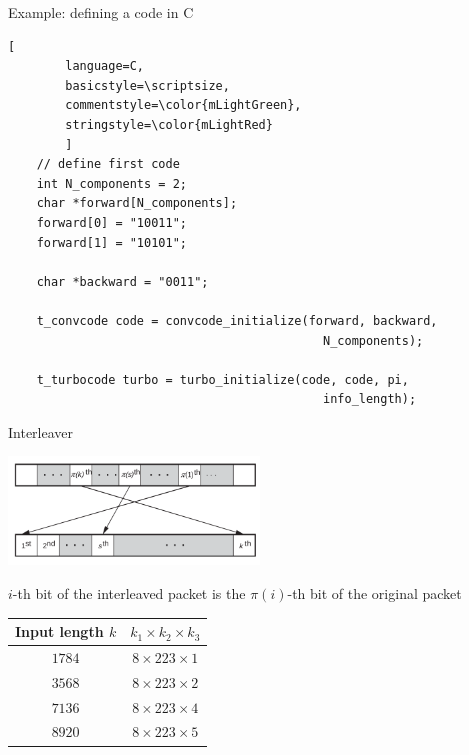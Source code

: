 \documentclass[xcolor={usenames,dvipsnames},11pt]{beamer}
\begin{document}
\begin{frame}[c,fragile]{Example: defining a code in C}
    \begin{lstlisting}[
        language=C,
        basicstyle=\scriptsize,
        commentstyle=\color{mLightGreen},
        stringstyle=\color{mLightRed}
        ]
    // define first code
    int N_components = 2;
    char *forward[N_components];
    forward[0] = "10011";
    forward[1] = "10101";

    char *backward = "0011";

    t_convcode code = convcode_initialize(forward, backward, 
                                            N_components);

    t_turbocode turbo = turbo_initialize(code, code, pi,
                                            info_length);
    \end{lstlisting}
    
\end{frame}
\begin{frame}{Interleaver}
    \begin{center}
        \includegraphics[width=0.5\textwidth]{./images/interleaver}
    \end{center}
    
    $i$-th bit of the interleaved packet is the $\pi(i)$-th bit of the original packet

    \begin{table}
        \centering
        \begin{tabular}{cc}
            \toprule
            Input length $k$ & $k_1 \times k_2 \times k_3$\\
            \midrule
            $1784$    &   $8  \times 223 \times 1$\\
            $3568$    &   $8  \times 223 \times 2$\\
            $7136$    &   $8  \times 223 \times 4$\\
            $8920$    &   $8  \times 223 \times 5$\\
            \bottomrule
        \end{tabular}
    \end{table}
\end{frame}
\end{document}
